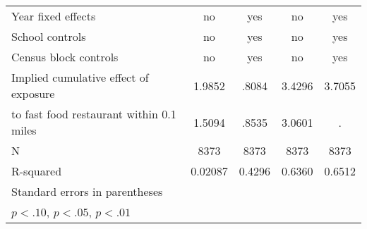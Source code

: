 {\begin{tabular*}{1\linewidth}{@{\hskip\tabcolsep\extracolsep\fill}l*{4}{c}}
Year fixed effects&       no         &      yes         &       no         &      yes         \\
School controls &       no         &      yes         &       no         &      yes         \\
Census block controls&       no         &      yes         &       no         &      yes         \\
Implied cumulative effect of exposure&   1.9852         &    .8084         &   3.4296         &   3.7055         \\
to fast food restaurant within 0.1 miles&   1.5094         &    .8535         &   3.0601         &        .         \\
N               &     8373         &     8373         &     8373         &     8373         \\
R-squared       &  0.02087         &   0.4296         &   0.6360         &   0.6512         \\
\hline\hline
\multicolumn{5}{l}{\footnotesize Standard errors in parentheses}\\
\multicolumn{5}{l}{\footnotesize \sym{*} \(p<.10\), \sym{**} \(p<.05\), \sym{***} \(p<.01\)}\\
\end{tabular*}
}
